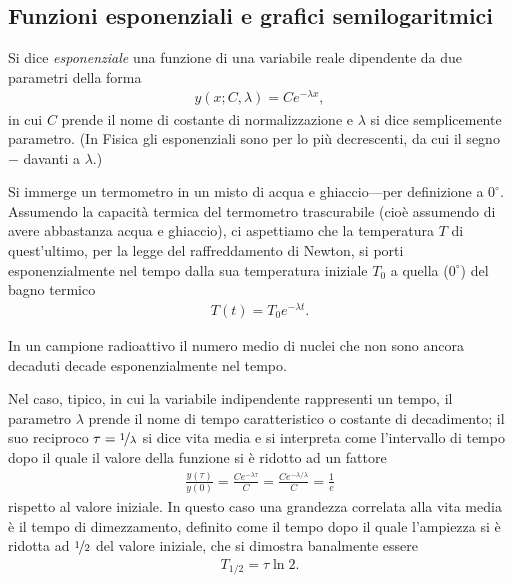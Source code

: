 \subsection{Funzioni esponenziali e grafici semilogaritmici}
\label{subsec:semilog}

Si dice \emph{esponenziale} una funzione di una variabile reale dipendente da
due parametri della forma
\begin{align}\label{eq:esponenziale}
  y(x; C, \lambda) = Ce^{-\lambda x},
\end{align}
in cui $C$ prende il nome di costante di normalizzazione e $\lambda$ si dice
semplicemente parametro. (In Fisica gli esponenziali sono per lo più decrescenti,
da cui il segno $-$ davanti a $\lambda$.)

\begin{examplebox}
  \begin{example}\label{exp:legge_di_newton}
    Si immerge un termometro in un misto di acqua e ghiaccio---per definizione a
    $0^\circ$. Assumendo la capacità termica del termometro trascurabile
    (cioè assumendo di avere abbastanza acqua e ghiaccio), ci aspettiamo che
    la temperatura $T$ di quest'ultimo, per la legge del raffreddamento di
    Newton, si porti esponenzialmente nel tempo dalla sua temperatura iniziale
    $T_0$ a quella ($0^\circ$) del bagno termico
    \begin{align*}
      T(t) = T_0 e^{-\lambda t}.
    \end{align*}
  \end{example}

  \begin{example}
    In un campione radioattivo il numero medio di nuclei che non sono ancora decaduti
    decade esponenzialmente nel tempo.
  \end{example}
\end{examplebox}

Nel caso, tipico, in cui la variabile indipendente rappresenti un tempo, il parametro
$\lambda$ prende il nome di tempo caratteristico o costante di decadimento; il suo
reciproco $\tau = \nicefrac{1}{\lambda}$ si dice vita media e si interpreta come
l'intervallo di tempo dopo il quale il valore della funzione si è ridotto ad un fattore
\begin{align}\label{eq:exp_decay_mean_lifetime}
  \frac{y(\tau)}{y(0)} = \frac{Ce^{-\lambda \tau}}{C} =
  \frac{Ce^{-\lambda/\lambda}}{C} = \frac{1}{e}
\end{align}
rispetto al valore iniziale. In questo caso una grandezza correlata alla vita media è il
tempo di dimezzamento, definito come il tempo dopo il quale l'ampiezza si è ridotta
ad $\nicefrac{1}{2}$ del valore iniziale, che si dimostra banalmente essere
\begin{align}\label{eq:exp_decay_half_life}
  T_{1/2} = \tau\ln2.
\end{align}

